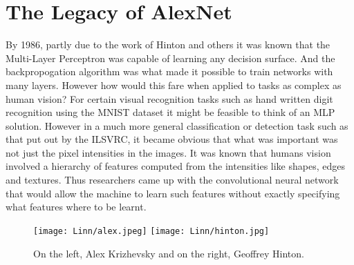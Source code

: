 \documentclass{../template/texnote}
\begin{document}
\section{The Legacy of AlexNet}
By 1986, partly due to the work of Hinton and others it was known that the Multi-Layer Perceptron was capable of learning any decision surface.
And the backpropogation algorithm was what made it possible to train networks with many layers.
However how would this fare when applied to tasks as complex as human vision?
For certain visual recognition tasks such as hand written digit recognition using the MNIST dataset it might be feasible to think of an MLP solution.
However in a much more general classification or detection task such as that put out by the ILSVRC, it became obvious that what was important was not just the pixel intensities in the images.
It was known that humans vision involved a hierarchy of features computed from the intensities like shapes, edges and textures.
Thus researchers came up with the convolutional neural network that would allow the machine to learn such features without exactly specifying what features where to be learnt.

    \begin{figure}
    \begin{center}
	\texttt{[image: Linn/alex.jpeg]}
	\texttt{[image: Linn/hinton.jpg]}
    \end{center}
    \caption{On the left, Alex Krizhevsky and on the right, Geoffrey Hinton.}
    \label{fig:}
    \end{figure}
    
\end{document}
